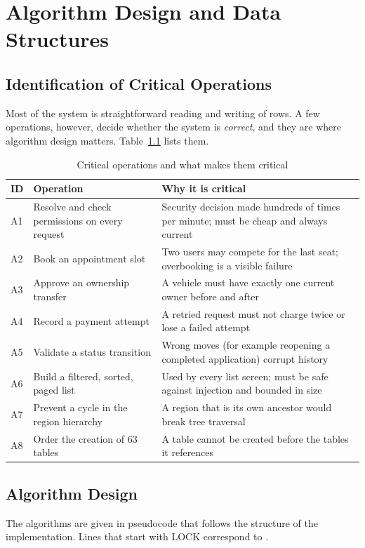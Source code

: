\chapter{Algorithm Design and Data Structures}\label{ch:algo}

\section{Identification of Critical Operations}
Most of the system is straightforward reading and writing of rows. A few operations,
however, decide whether the system is \emph{correct}, and they are where algorithm design
matters. Table~\ref{tab:critical} lists them.

\begin{table}[H]
\centering\small
\caption{Critical operations and what makes them critical}\label{tab:critical}
\begin{tabularx}{\linewidth}{@{}p{0.9cm}p{4.2cm}X@{}}
\toprule \textbf{ID} & \textbf{Operation} & \textbf{Why it is critical}\\ \midrule
A1 & Resolve and check permissions on every request & Security decision made hundreds of times per minute; must be cheap and always current\\
A2 & Book an appointment slot & Two users may compete for the last seat; overbooking is a visible failure\\
A3 & Approve an ownership transfer & A vehicle must have exactly one current owner before and after\\
A4 & Record a payment attempt & A retried request must not charge twice or lose a failed attempt\\
A5 & Validate a status transition & Wrong moves (for example reopening a completed application) corrupt history\\
A6 & Build a filtered, sorted, paged list & Used by every list screen; must be safe against injection and bounded in size\\
A7 & Prevent a cycle in the region hierarchy & A region that is its own ancestor would break tree traversal\\
A8 & Order the creation of 63 tables & A table cannot be created before the tables it references\\
\bottomrule
\end{tabularx}
\end{table}

\section{Algorithm Design}
The algorithms are given in pseudocode that follows the structure of the implementation.
Lines that start with \textsf{LOCK} correspond to .

